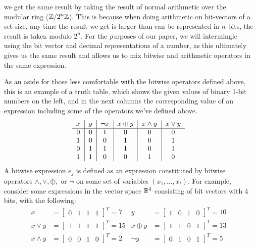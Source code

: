 we get the same result by taking the result of normal arithmetic over the modular ring 
($\mathbb{Z}/2^n\mathbb{Z}$). This is because when doing arithmetic on bit-vectors of a set size, 
any time the result we get is larger than can be represented in $n$ bits, the result
is taken modulo $2^n$. For the purposes of our paper, we will intermingle using the 
bit vector and decimal representations of a number, as this ultimately gives us the 
same result and allows us to mix bitwise and arithmetic operators in the same
expression.
\par As an aside for those less comfortable with the bitwise operators defined above, 
this is an example of a truth table, which shows the given values of binary 1-bit
numbers on the left, and in the next columns the corresponding value of an 
expression including some of the operators we've defined above.
\begin{align*}
    \begin{tabular}{c|c|c|c|c|c}
        $x$ & $y$ & $\neg x$ & $x \oplus y$ & $x \land y$ & $x \lor y$\\
        \hline
        0 & 0 & 1 & 0 & 0 & 0\\
        1 & 0 & 0 & 1 & 0 & 1\\
        0 & 1 & 1 & 1 & 0 & 1\\
        1 & 1 & 0 & 0 & 1 & 0\\
    \end{tabular}
\end{align*}
 {
    A bitwise expression $e_j$ is defined as an expression constituted by
    bitwise operators $\land, \lor, \oplus,$ or $\neg$ on some set of variables
    $(x_1, \dots, x_t)$. For example, consider some expressions in the vector space $\mathbb{B}^4$ consisting
    of bit vectors with $4$ bits, with the following:
    \begin{align*}
        x &= \begin{bmatrix}
        0 & 1 & 1 & 1
    \end{bmatrix}^T = 7 & y &= \begin{bmatrix}
        1 & 0 & 1 & 0
    \end{bmatrix}^T = 10
    \\
    x \lor y &= \begin{bmatrix}
        1 & 1 & 1 & 1
    \end{bmatrix}^T = 15
             & x \oplus y &= \begin{bmatrix}
                  1 & 1 & 0 & 1
              \end{bmatrix}^T = 13
    \\
        x \land y &= 
        \begin{bmatrix}
            0 & 0 & 1 & 0
        \end{bmatrix}^T = 2 & \neg y &= \begin{bmatrix}
        0 & 1 & 0 & 1
        \end{bmatrix}^T
        = 5
    \end{align*}
}
